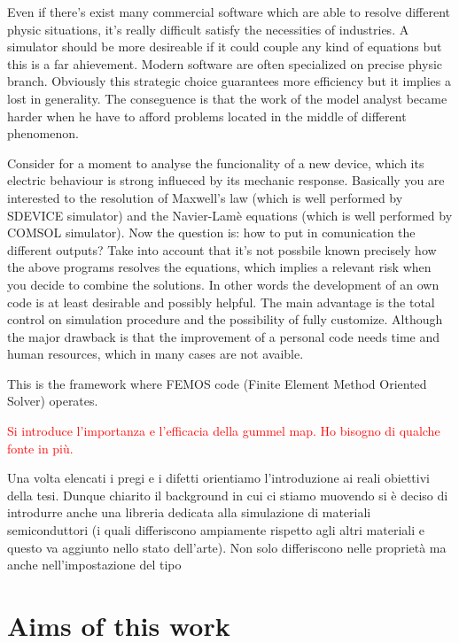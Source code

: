 Even if there's exist many commercial software which are able to resolve different physic situations, it's really difficult satisfy the necessities of industries. A simulator should be more desireable if it  could couple any kind of equations but this is a far ahievement. Modern software are often specialized on precise physic branch. Obviously this strategic choice guarantees more efficiency but it implies a lost in generality. The conseguence is that the work of the model analyst became harder when he have to afford problems located in the middle of different phenomenon. 

Consider for a moment to analyse the funcionality of a new device, which its electric behaviour is strong influeced by its mechanic response. Basically you are interested to the resolution of Maxwell's law  (which is well performed by SDEVICE simulator) and the Navier-Lam\`e equations (which is well performed by COMSOL simulator). Now the question is: how to put in comunication the different outputs?
Take into account that it's not possbile known precisely how the above programs resolves the equations, which implies a relevant risk when you decide to combine the solutions. 
In other words the development of an own code is at least desirable and possibly helpful. The main advantage is the total control on simulation procedure and the possibility of fully customize. Although the major drawback is that the improvement of a personal code needs time and human resources, which in many cases are not avaible.   

This is the framework where FEMOS code (Finite Element Method Oriented Solver) operates. 




	
\vspace{2cm}



\textcolor{red}{
Si introduce l'importanza e l'efficacia della gummel map. Ho bisogno di qualche fonte in pi\`u.}

Una volta elencati i pregi e i difetti orientiamo l'introduzione ai reali obiettivi della tesi. Dunque chiarito il background in cui ci stiamo muovendo si \`e deciso di introdurre anche una libreria dedicata alla simulazione di materiali semiconduttori (i quali differiscono ampiamente rispetto agli altri materiali e questo va aggiunto nello stato dell'arte). Non solo differiscono nelle propriet\`a ma anche nell'impostazione del tipo 

\section{Aims of this work}


